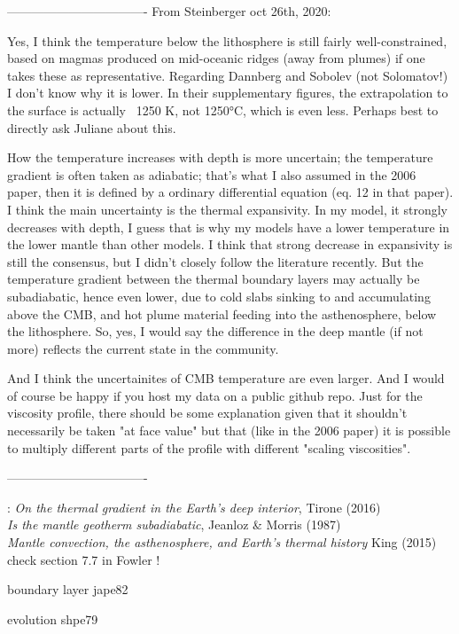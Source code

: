 ----------------------------------
From Steinberger oct 26th, 2020:

Yes, I think the temperature below the lithosphere is still fairly well-constrained, based on magmas produced on mid-oceanic ridges (away from plumes) if one takes these as representative. Regarding Dannberg and Sobolev (not Solomatov!) I don't know why it is lower. In their supplementary figures, the extrapolation to the surface is actually ~1250 K, not 1250°C, which is even less. Perhaps best to directly ask Juliane about this.

How the temperature increases with depth is more uncertain; the temperature gradient is often taken as adiabatic; that's what I also assumed in the 2006 paper, then it is defined by a ordinary differential equation (eq. 12 in that paper). I think the main uncertainty is the thermal expansivity. In my model, it strongly decreases with depth, I guess that is why my models have a lower temperature in the lower mantle than other models. I think that strong decrease in expansivity is still the consensus, but I didn't closely follow the literature recently. But the temperature gradient between the thermal boundary layers may actually be subadiabatic, hence even lower, due to cold slabs sinking to and accumulating above the CMB, and hot plume material feeding into the asthenosphere, below the lithosphere. So, yes, I would say the difference in the deep mantle (if not more) reflects the current state in the community.

And I think the uncertainites of CMB temperature are even larger. And I would of course be happy if you host my data on a public github repo. Just for the viscosity profile, there should be some explanation given that it shouldn't necessarily be taken "at face value" but that (like in the 2006 paper) it is possible to multiply different parts of the profile with different "scaling viscosities".

----------------------------------

\Literature: 
{\it On the thermal gradient in the Earth’s deep interior}, Tirone (2016) \cite{tiro16} \\
{\it Is the mantle geotherm subadiabatic}, Jeanloz \& Morris (1987) \cite{jemo87} \\
{\it Mantle convection, the asthenosphere, and Earth's thermal history} King (2015) \cite{king15}\\

check section 7.7 in Fowler !

boundary layer jape82

evolution shpe79
